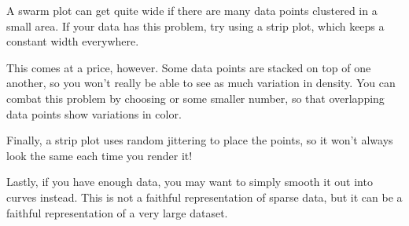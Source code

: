 \documentclass[letterpaper,10pt,english]{sphinxmanual}
\begin{document}
\begin{sphinxVerbatim}[commandchars=\\\{\}]
   
  
\end{sphinxVerbatim}

\noindent{}

A swarm plot can get quite wide if there are many data points clustered in a small area.  If your data has this problem, try using a strip plot, which keeps a constant width everywhere.

This comes at a price, however.  Some data points are stacked on top of one another, so you won’t really be able to see as much variation in density.  You can combat this problem by choosing  or some smaller number, so that overlapping data points show variations in color.

Finally, a strip plot uses random jittering to place the points, so it won’t always look the same each time you render it!

\begin{sphinxVerbatim}[commandchars=\\\{\}]
   
  
\end{sphinxVerbatim}

\noindent{}

Lastly, if you have enough data, you may want to simply smooth it out into curves instead.  This is not a faithful representation of sparse data, but it can be a faithful representation of a very large dataset.

\begin{sphinxVerbatim}[commandchars=\\\{\}]
   
  
\end{sphinxVerbatim}
\end{document}
